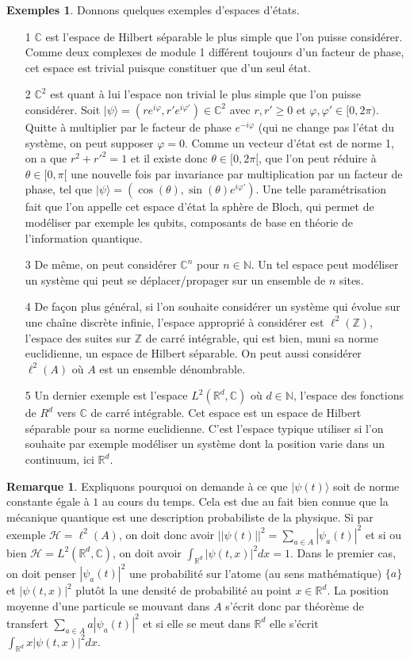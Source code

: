 \documentclass[12pt,openany,a4paper, titlepage]{article}
\newcommand{\lp}{\left(}
\newcommand{\rp}{\right)}
\newcommand{\R}{\mathbb{R}}
\newcommand{\C}{\mathbb{C}}
\newcommand{\Z}{\mathbb{Z}}
\newcommand{\N}{\mathbb{N}}
\newcommand{\HH}{\mathcal{H}}
\newcommand{\vp}{\varphi}
\theoremstyle{definition}
\theoremstyle{definition}
\theoremstyle{definition}
\theoremstyle{definition}
\newtheorem{exs}{Exemples}
\theoremstyle{definition}
\newtheorem{rem}{Remarque}
\theoremstyle{definition}
\begin{document}
\begin{exs}
    Donnons quelques exemples d'espaces d'états.
    \begin{enumerate}
        \item[1] $\C$ est l'espace de Hilbert séparable le plus simple que l'on puisse considérer. Comme deux complexes de module 1 différent toujours d'un facteur de phase, cet espace est trivial puisque constituer que d'un seul état.
        \item[2] $\C^2$ est quant à lui l'espace non trivial le plus simple que l'on puisse considérer. Soit $|\psi\rangle = (re^{i\vp}, r'e^{i\vp'}) \in \C^2$ avec $r,r'\geq 0$ et $\vp, \vp' \in [0,2\pi)$. Quitte à multiplier par le facteur de phase $e^{-i\vp}$ (qui ne change pas l'état du système, on peut supposer $\vp = 0$. Comme un vecteur d'état est de norme 1, on a que $r^2 + r'^2 = 1$ et il existe donc $\theta \in [0,2\pi[$, que l'on peut réduire à $\theta \in [0,\pi[$ une nouvelle fois par invariance par multiplication par un facteur de phase, tel que $|\psi\rangle = \lp \cos(\theta), \sin(\theta)e^{i\vp'}\rp$. Une telle paramétrisation fait que l'on appelle cet espace d'état la sphère de Bloch, qui permet de modéliser par exemple les qubits, composants de base en théorie de l'information quantique.
        \item[3] De même, on peut considérer $\C^n$ pour $n\in\N$. Un tel espace peut modéliser un système qui peut se déplacer/propager sur un ensemble de $n$ sites.
        \item[4]  De façon plus général, si l'on souhaite considérer un système qui évolue sur une chaîne discrète infinie, l'espace approprié à considérer est $\ell^2(\Z)$, l'espace des suites sur $\Z$ de carré intégrable, qui est bien, muni sa norme euclidienne, un espace de Hilbert séparable. On peut aussi considérer $\ell^2(A)$ où $A$ est un ensemble dénombrable.
        \item[5] Un dernier exemple est l'espace $L^2(\R^d,\C)$ où $d\in\N$, l'espace des fonctions de $R^d$ vers $\C$ de carré intégrable. Cet espace est un espace de Hilbert séparable pour sa norme euclidienne. C'est l'espace typique utiliser si l'on souhaite par exemple modéliser un système dont la position varie dans un continuum, ici $\R^d$.
    \end{enumerate}
\end{exs}

\begin{rem}
    Expliquons pourquoi on demande à ce que $|\psi(t)\rangle$ soit de norme constante égale à $1$ au cours du temps. Cela est due au fait bien connue que la mécanique quantique est une description probabiliste de la physique. Si par exemple $\HH = \ell^2(A)$, on doit donc avoir $||\psi(t)||^2 = \sum_{a\in A} |\psi_a(t)|^2$ et si ou bien $\HH = L^2(\R^d,\C)$, on doit avoir $\int_{\R^d}|\psi(t,x)|^2dx = 1$. Dans le premier cas, on doit penser $|\psi_a(t)|^2$ une probabilité sur l'atome (au sens mathématique) $\{a\}$ et $|\psi(t,x)|^2$ plutôt la une densité de probabilité au point $x \in \R^d$. La position moyenne d'une particule se mouvant dans $A$ s'écrit donc par théorème de transfert $\sum_{a\in A} a|\psi_a(t)|^2$ et si elle se meut dans $\R^d$ elle s'écrit $\int_{\R^d}x|\psi(t,x)|^2dx$.
\end{rem}
\end{document}

